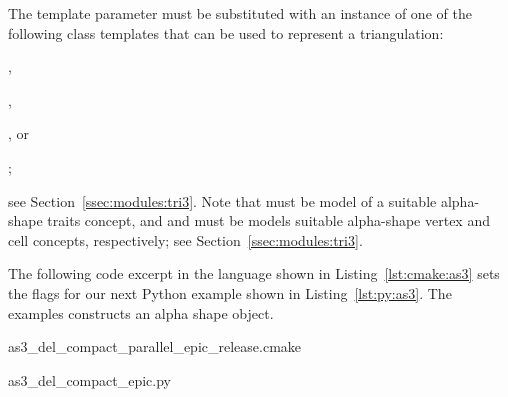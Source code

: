 \begin{table}[!htp]
 \caption{\iiiDAlphaShapesPackage{} types}
  \centering{}
 \label{tab:as3:types}
\end{table}

The template parameter  must be substituted with an
instance of one of the following class templates that can be used to
represent a triangulation:
\begin{compactenum}
\item {},
\item {},
\item {}, or
\item {};
\end{compactenum}
see Section~\ref{ssec:modules:tri3}.  Note that
 must be model of a suitable alpha-shape
traits concept, and  and
 must be models suitable alpha-shape vertex and
cell concepts, respectively; see Section~\ref{ssec:modules:tri3}.

The following code excerpt in the \cmake{} language shown in
Listing~\ref{lst:cmake:as3} sets the \cmake{} flags for our next
Python example shown in Listing~\ref{lst:py:as3}. The examples
constructs an alpha shape object.

\begin{lstfloat}
  \def\filename{as3_del_compact_parallel_epic_release.cmake}%
  
                  {\cmakeDir\filename}
\end{lstfloat}

\begin{lstfloat}
  \def\filename{as3_del_compact_epic.py}%
  
                  {\pythonDir\filename}
\end{lstfloat}

